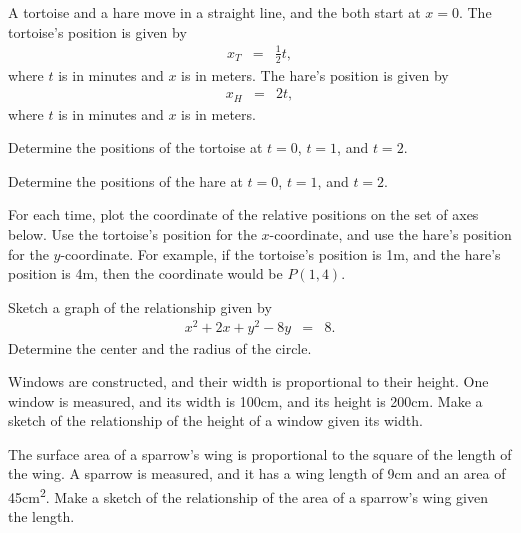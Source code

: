 

\begin{problem}
\item A tortoise and a hare move in a straight line, and the both
  start at $x=0$. The tortoise's position is given by
  \begin{eqnarray*}
    x_T & = & \frac{1}{2} t,
  \end{eqnarray*}
  where $t$ is in minutes and $x$ is in meters.  The hare's position
  is given by
  \begin{eqnarray*}
    x_H & = & 2 t,
  \end{eqnarray*}
  where $t$ is in minutes and $x$ is in meters.
  \begin{subproblem}
  \item Determine the positions of the tortoise at $t=0$, $t=1$, and
    $t=2$.
    \vfill
  \item Determine the positions of the hare at $t=0$, $t=1$, and
    $t=2$.  
    \vfill
  \item For each time, plot the coordinate of the relative positions
    on the set of axes below. Use the tortoise's position for the
    $x$-coordinate, and use the hare's position for the
    $y$-coordinate. For example, if the tortoise's position is 1m, and
    the hare's position is 4m, then the coordinate would be $P(1,4)$.

    \scalebox{0.95}{}

  \end{subproblem}
\end{problem}


\begin{problem}
\item Sketch a graph of the relationship given by
  \begin{eqnarray*}
    x^2 + 2x + y^2 - 8y & = & 8.
  \end{eqnarray*}
  Determine the center and the radius of the circle.
  \vfill

  \clearpage

\item Windows are constructed, and their width is proportional to
  their height. One window is measured, and its width is 100cm, and its
  height is 200cm. Make a sketch of the relationship of the height of
  a window given its width.

  \vfill

\item The surface area of a sparrow's wing is proportional to the
  square of the length of the wing. A sparrow is measured, and it has
  a wing length of 9cm and an area of 45cm\textsuperscript{2}. Make a
  sketch of the relationship of the area of a sparrow's wing given the
  length. 

  \vfill


\end{problem}

